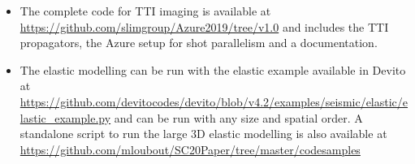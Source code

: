 \documentclass[10pt, conference]{IEEEtran}
\begin{document}
\begin{itemize}
  \item The complete code for TTI imaging is available at \url{https://github.com/slimgroup/Azure2019/tree/v1.0} and includes 
  the TTI propagators, the Azure setup for shot parallelism and a documentation.
  \item The elastic modelling can be run with the elastic example available in Devito at
  \url{https://github.com/devitocodes/devito/blob/v4.2/examples/seismic/elastic/elastic_example.py} 
  and can be run with any size and spatial order. A standalone script to run the large 3D elastic modelling
  is also available at \url{https://github.com/mloubout/SC20Paper/tree/master/codesamples}
\end{itemize}


\end{document}
